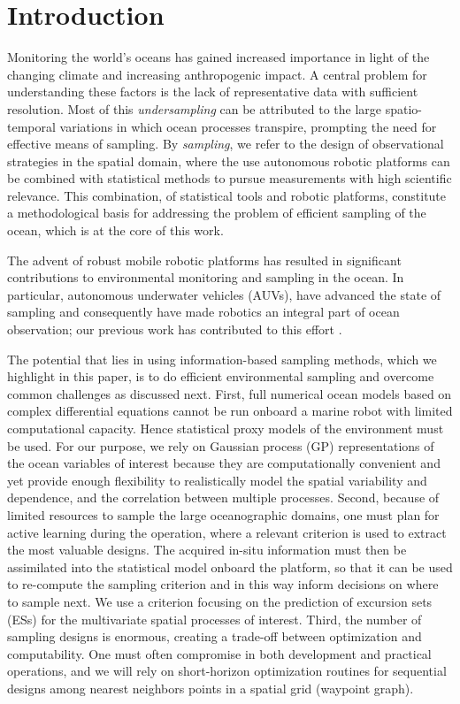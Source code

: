\documentclass[aoas]{imsart}
\begin{document}
\section{Introduction}

Monitoring the world's oceans has gained increased importance in light
of the changing climate and increasing anthropogenic impact. A central
problem for understanding these factors is the lack of representative
data with sufficient resolution. Most of this \emph{undersampling} can
be attributed to the large spatio-temporal variations in which ocean
processes transpire, prompting the need for effective means of
sampling. By \emph{sampling}, we refer to the design of observational
strategies in the spatial domain, where the use autonomous robotic
platforms can be combined with statistical methods to pursue
measurements with high scientific relevance. This combination, of
statistical tools and robotic platforms, constitute a methodological
basis for addressing the problem of efficient sampling of the ocean,
which is at the core of this work.

The
advent of robust mobile robotic platforms \citep{Bellingham07} has
resulted in significant contributions to environmental monitoring and
sampling in the ocean. In particular, autonomous underwater vehicles (AUVs), have
advanced the state of sampling and consequently have made robotics an
integral part of ocean observation; our previous work has contributed
to this effort \citep{das11b,Das2015,fossuminformation,fossum18b}. 

The potential that lies in using information-based sampling methods, which we
highlight in this paper, is to do efficient environmental sampling and
overcome common challenges as discussed next. First, full numerical ocean models based on complex
differential equations cannot be run onboard a marine robot with
limited computational capacity.
Hence statistical proxy models of the environment must be used. For our purpose, we rely on Gaussian process (GP)
representations of the ocean variables of interest because they are computationally convenient and yet provide enough flexibility to realistically model the spatial variability and dependence, and the correlation between multiple processes. Second, because of limited resources to sample the large oceanographic domains, one must plan for
active learning during the operation, where a relevant criterion is
used to extract the most valuable designs. The acquired in-situ
information must then be assimilated into the statistical model
onboard the platform, so that it can be used to re-compute the
sampling criterion and in this way inform decisions on where to sample
next. We use a criterion focusing on the prediction of excursion sets
(ESs) for the multivariate spatial processes of interest. Third, the
number of sampling designs is enormous, creating a trade-off between
optimization and computability. One must often compromise in both
development and practical operations, and we will rely on
short-horizon optimization routines for sequential designs among
nearest neighbors points in a spatial grid (waypoint graph).
\end{document}
